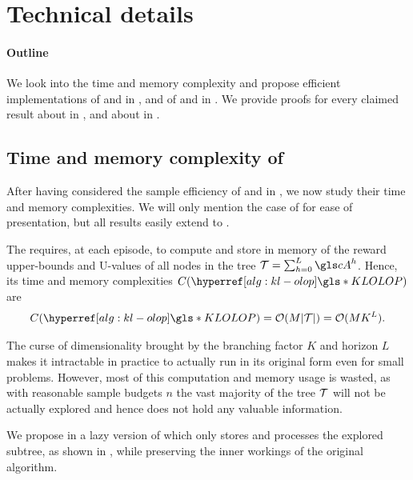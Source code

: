 \graphicspath{{2-Chapters/6-Chapter/}}

\section{Technical details}

\paragraph{Outline}
We look into the time and memory complexity and propose efficient implementations of \OLOP and \KLOLOP in , and of \GBOPD and \GBOP in . We provide proofs for every claimed result about \KLOLOP in , and about \GBOP in .

\subsection{Time and memory complexity of \KLOLOP}
\label{sec:kl-olop-time}

After having considered the sample efficiency of \OLOP and \KLOLOP in , we now study their time and memory complexities. We will only mention the case of \KLOLOP for ease of presentation, but all results easily extend to \OLOP.

The  requires, at each episode, to compute and store in memory of the reward upper-bounds and U-values of all nodes in the tree $\Tau = \sum_{h=0}^L \cA^h$.
Hence, its time and memory complexities $C(\KLOLOP)$ are 
\begin{equation*}
C(\KLOLOP) = \cO(M|\Tau|) = \cO(MK^L).
\end{equation*}

The curse of dimensionality brought by the branching factor $K$ and horizon $L$ makes it intractable in practice to actually run \KLOLOP in its original form even for small problems. However, most of this computation and memory usage is wasted, as with reasonable sample budgets $n$ the vast majority of the tree $\mathcal{T}$ will not be actually explored and hence does not hold any valuable information.

We propose in  a lazy version of \KLOLOP which only stores and processes the explored subtree, as shown in , while preserving the inner workings of the original algorithm.

